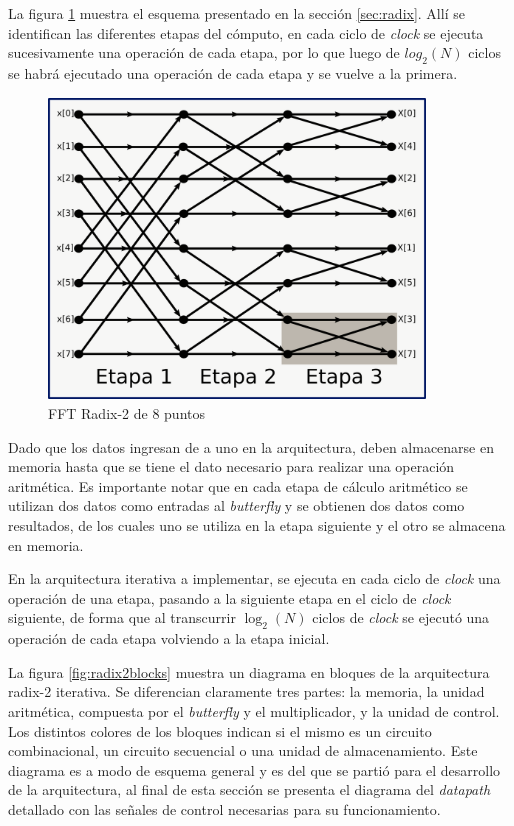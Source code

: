 La figura \ref{fig:r2_8_c3} muestra el esquema presentado en la sección \ref{sec:radix}. Allí se
identifican las diferentes etapas del cómputo, en cada ciclo de \textit{clock} se ejecuta
sucesivamente una operación de cada etapa, por lo que luego de $log_2(N)$ ciclos se habrá ejecutado
una operación de cada etapa y se vuelve a la primera.

\begin{figure}[htb!]
        \centering
        \includegraphics[width=10cm]{./figures/r2_8_diag.png}
        \caption{FFT Radix-2 de 8 puntos}
        \label{fig:r2_8_c3}
\end{figure}

Dado que los datos ingresan de a uno en la arquitectura, deben almacenarse en memoria hasta que se
tiene el dato necesario para realizar una operación aritmética. Es importante notar que en cada
etapa de cálculo aritmético se utilizan dos datos como entradas al \textit{butterfly} y se obtienen
dos datos como resultados, de los cuales uno se utiliza en la etapa siguiente y el otro se almacena en memoria.

En la arquitectura iterativa a implementar, se ejecuta en cada ciclo de \textit{clock} una operación
de una etapa, pasando a la siguiente etapa en el ciclo de \textit{clock} siguiente, de forma que al
transcurrir $\log_2(N)$ ciclos de \textit{clock} se ejecutó una operación de cada etapa volviendo a
la etapa inicial.

La figura \ref{fig:radix2blocks} muestra un diagrama en bloques de la arquitectura radix-2
iterativa. Se diferencian claramente tres partes: la memoria, la unidad aritmética, compuesta por el
\textit{butterfly} y el multiplicador, y la unidad de control. Los distintos colores de los bloques
indican si el mismo es un circuito combinacional, un circuito secuencial o una unidad de
almacenamiento. Este diagrama es a modo de esquema general y es del que se partió para el
desarrollo de la arquitectura, al final de esta sección se presenta el diagrama del
\textit{datapath} detallado con las señales de control necesarias para su funcionamiento.	


